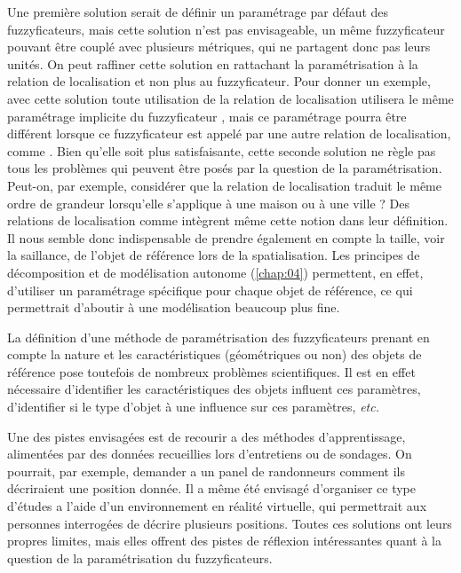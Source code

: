 Une première solution serait de définir un paramétrage par défaut des
fuzzyficateurs, mais cette solution n'est pas envisageable, un même
fuzzyficateur pouvant être couplé avec plusieurs métriques, qui ne
partagent donc pas leurs unités. On peut raffiner cette solution en
rattachant la paramétrisation à la relation de localisation et non
plus au fuzzyficateur. Pour donner un exemple, avec cette solution
toute utilisation de la relation de localisation
 utilisera le même paramétrage implicite du
fuzzyficateur , mais ce paramétrage pourra
être différent lorsque ce fuzzyficateur est appelé par une autre
relation de localisation, comme . Bien
qu'elle soit plus satisfaisante, cette seconde solution ne règle pas
tous les problèmes qui peuvent être posés par la question de la
paramétrisation. Peut-on, par exemple, considérer que la relation de
localisation  traduit le même ordre de grandeur
lorsqu'elle s'applique à une maison ou à une ville ? Des relations de
localisation comme  intègrent même cette
notion dans leur définition. Il nous semble donc indispensable de
prendre également en compte la taille, voir la saillance, de l'objet
de référence lors de la spatialisation. Les principes de décomposition
et de modélisation autonome (\autoref{chap:04}) permettent, en effet,
d'utiliser un paramétrage spécifique pour chaque objet de référence,
ce qui permettrait d'aboutir à une modélisation beaucoup plus fine.

La définition d'une méthode de paramétrisation des fuzzyficateurs
prenant en compte la nature et les caractéristiques (géométriques ou
non) des objets de référence pose toutefois de nombreux problèmes
scientifiques. Il est en effet nécessaire d'identifier les
caractéristiques des objets influent ces paramètres, d'identifier si
le type d'objet à une influence sur ces paramètres, \emph{etc.}

Une des pistes envisagées est de recourir a des méthodes
d'apprentissage, alimentées par des données recueillies lors
d'entretiens ou de sondages. On pourrait, par exemple, demander a un
panel de randonneurs comment ils décriraient une position donnée. Il a
même été envisagé d'organiser ce type d'études a l'aide d'un
environnement en réalité virtuelle, qui permettrait aux personnes
interrogées de décrire plusieurs positions. Toutes ces solutions ont
leurs propres limites, mais elles offrent des pistes de réflexion
intéressantes quant à la question de la paramétrisation du
fuzzyficateurs.


